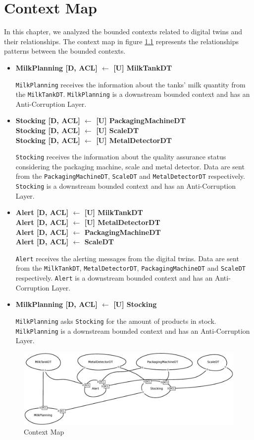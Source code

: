 \chapter{Context Map}
In this chapter, we analyzed the bounded contexts related to digital twins and their relationships.
The context map in figure \ref{img:context-map} represents the relationships patterns between the bounded contexts.

\begin{itemize}
    \item \textbf{MilkPlanning [D, ACL] $\leftarrow$ [U] MilkTankDT}
    
    \texttt{MilkPlanning} receives the information about the tanks' milk quantity from the \texttt{MilkTankDT}.
    \texttt{MilkPlanning} is a downstream bounded context and has an Anti-Corruption Layer.
    
    \item \textbf{Stocking [D, ACL] $\leftarrow$ [U] PackagingMachineDT \\ 
    Stocking [D, ACL] $\leftarrow$ [U] ScaleDT \\ 
    Stocking [D, ACL] $\leftarrow$ [U] MetalDetectorDT}

    \texttt{Stocking} receives the information about the quality assurance status considering the packaging machine, scale and metal detector. Data are sent from the \texttt{PackagingMachineDT}, \texttt{ScaleDT} and \texttt{MetalDetectorDT} respectively.
    \texttt{Stocking} is a downstream bounded context and has an Anti-Corruption Layer.
	
	\item \textbf{Alert [D, ACL] $\leftarrow$ [U] MilkTankDT \\
	Alert [D, ACL] $\leftarrow$ [U] MetalDetectorDT \\
	Alert [D, ACL] $\leftarrow$ PackagingMachineDT \\
	Alert [D, ACL] $\leftarrow$ ScaleDT}

    \texttt{Alert} receives the alerting messages from the digital twins. Data are sent from the \texttt{MilkTankDT}, \texttt{MetalDetectorDT}, \texttt{PackagingMachineDT} and \texttt{ScaleDT} respectively.
    \texttt{Alert} is a downstream bounded context and has an Anti-Corruption Layer.

    \item \textbf{MilkPlanning [D, ACL] $\leftarrow$  [U] Stocking} 
    
    \texttt{MilkPlanning} asks \texttt{Stocking} for the amount of products in stock.
    \texttt{MilkPlanning} is a downstream bounded context and has an Anti-Corruption Layer.

\end{itemize}

\begin{figure}[H]
    \centering
    \includegraphics[width=\textwidth]{img/contextMap.eps}
    \caption{Context Map}
    \label{img:context-map}
\end{figure}


